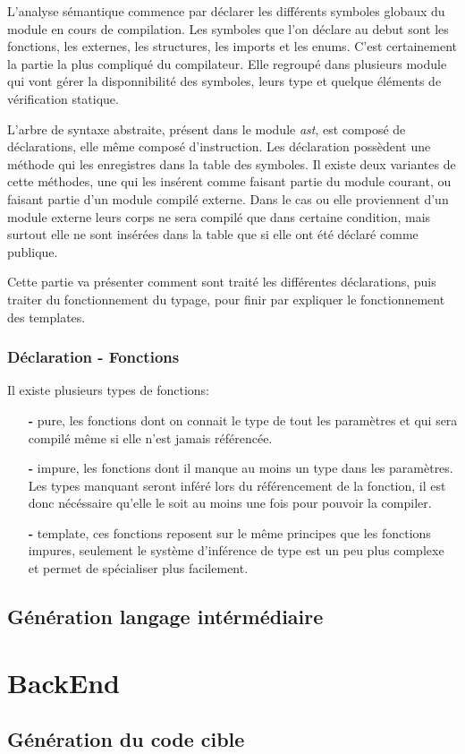 \documentclass[a4paper, 11pt]{article}
\begin{document}
L'analyse sémantique commence par déclarer les différents symboles globaux du module en cours de compilation. Les symboles que l'on déclare au debut sont les fonctions, les externes, les structures, les imports et les enums. C'est certainement la partie la plus compliqué du compilateur. Elle regroupé dans plusieurs module qui vont gérer la disponnibilité des symboles, leurs type et quelque éléments de vérification statique.

L'arbre de syntaxe abstraite, présent dans le module \textit{ast}, est composé de déclarations, elle même composé d'instruction. Les déclaration possèdent une méthode qui les enregistres dans la table des symboles. Il existe deux variantes de cette méthodes, une qui les insérent comme faisant partie du module courant, ou faisant partie d'un module compilé externe. Dans le cas ou elle proviennent d'un module externe leurs corps ne sera compilé que dans certaine condition, mais surtout elle ne sont insérées dans la table que si elle ont été déclaré comme publique.

Cette partie va présenter comment sont traité les différentes déclarations, puis traiter du fonctionnement du typage, pour finir par expliquer le fonctionnement des templates.
\subsubsection {Déclaration - Fonctions}

Il existe plusieurs types de fonctions:
\begin{itemize}
\item [\textbf{-}] pure, les fonctions dont on connait le type de tout les paramètres et qui sera compilé même si elle n'est jamais référencée.
\item [\textbf{-}] impure, les fonctions dont il manque au moins un type dans les paramètres. Les types manquant seront inféré lors du référencement de la fonction, il est donc nécéssaire qu'elle le soit au moins une fois pour pouvoir la compiler.
\item [\textbf{-}] template, ces fonctions reposent sur le même principes que les fonctions impures, seulement le système d'inférence de type est un peu plus complexe et permet de spécialiser plus facilement.
\end{itemize}





\subsection {Génération langage intérmédiaire}

\section {BackEnd}
\subsection {Génération du code cible}
\end{document}
